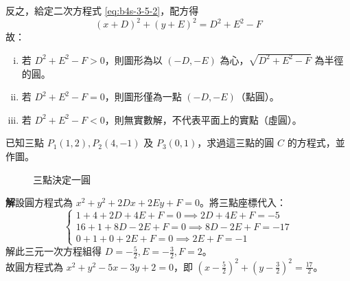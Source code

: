反之，給定二次方程式 \eqref{eq:b4s-3-5-2}，配方得
\[ (x+D)^2 + (y+E)^2 = D^2 + E^2 - F \]
故：
\begin{enumerate}[(i)]
  \item 若 $D^2 + E^2 - F > 0$，則圖形為以 $(-D, -E)$ 為心，$\sqrt{D^2 + E^2 - F}$ 為半徑的圓。
  \item 若 $D^2 + E^2 - F = 0$，則圖形僅為一點 $(-D, -E)$（點圓）。
  \item 若 $D^2 + E^2 - F < 0$，則無實數解，不代表平面上的實點（虛圓）。
\end{enumerate}

\begin{example}
已知三點 $P_1(1,2), P_2(4,-1)$ 及 $P_3(0,1)$，求過這三點的圓 $C$ 的方程式，並作圖。

\begin{figure}[htbp]
\centering
{}
\caption{三點決定一圓}
\label{fig:b4s-3-33}
\end{figure}

\textbf{解}\quad 設圓方程式為 $x^2 + y^2 + 2Dx + 2Ey + F = 0$。將三點座標代入：
\[
\begin{cases}
1 + 4 + 2D + 4E + F = 0 \implies 2D + 4E + F = -5 \\
16 + 1 + 8D - 2E + F = 0 \implies 8D - 2E + F = -17 \\
0 + 1 + 0 + 2E + F = 0 \implies 2E + F = -1
\end{cases}
\]
解此三元一次方程組得 $D = -\frac{5}{2}, E = -\frac{3}{2}, F = 2$。\\
故圓方程式為 $x^2 + y^2 - 5x - 3y + 2 = 0$，即 $(x - \frac{5}{2})^2 + (y - \frac{3}{2})^2 = \frac{17}{2}$。
\end{example}

